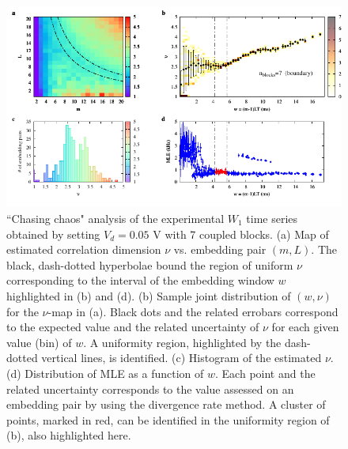 \begin{figure}[H]
    \centering
    \includegraphics[width=\linewidth]{../blocks/7_blocks/edge/2e5_points/plots/chaos_low.pdf}
    \caption{``Chasing chaos" analysis of the experimental $W_1$ time series obtained by setting $V_d=0.05$ V with 7 coupled blocks.
    (a) Map of estimated correlation dimension $\nu$ vs. embedding pair $(m, L)$.
    The black, dash-dotted hyperbolae bound the region of uniform $\nu$ corresponding to the interval of the
    embedding window $w$ highlighted in (b) and (d).
    (b) Sample joint distribution of $(w,\nu)$ for the $\nu$-map in (a).
    Black dots and the related errobars correspond to the expected value and the related uncertainty of $\nu$
    for each given value (bin) of $w$. A uniformity region, highlighted by the dash-dotted vertical lines,
    is identified. (c) Histogram of the estimated $\nu$. (d) Distribution of MLE as a function of $w$. Each point and the related
    uncertainty corresponds to the value assessed on an embedding pair by using the divergence rate method.
    A cluster of points, marked in red, can be identified in the uniformity region of (b), also highlighted here.}
    \label{fig:7 blocks chaos}
\end{figure}

